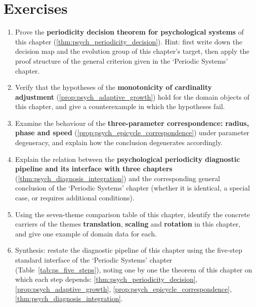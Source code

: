 \section*{Exercises}

\begin{enumerate}[leftmargin=3em, label=\textbf{Exercise \arabic*}]
    \item Prove the \textbf{periodicity decision theorem for psychological systems} of this chapter (\ref{thm:psych_periodicity_decision}). Hint: first write down the decision map and the evolution group of this chapter's target, then apply the proof structure of the general criterion given in the `Periodic Systems' chapter.

    \item Verify that the hypotheses of the \textbf{monotonicity of cardinality adjustment} (\ref{prop:psych_adaptive_growth}) hold for the domain objects of this chapter, and give a counterexample in which the hypotheses fail.

    \item Examine the behaviour of the \textbf{three-parameter correspondence: radius, phase and speed} (\ref{prop:psych_epicycle_correspondence}) under parameter degeneracy, and explain how the conclusion degenerates accordingly.

    \item Explain the relation between the \textbf{psychological periodicity diagnostic pipeline and its interface with three chapters} (\ref{thm:psych_diagnosis_integration}) and the corresponding general conclusion of the `Periodic Systems' chapter (whether it is identical, a special case, or requires additional conditions).

    \item Using the seven-theme comparison table of this chapter, identify the concrete carriers of the themes \textbf{translation}, \textbf{scaling} and \textbf{rotation} in this chapter, and give one example of domain data for each.

    \item Synthesis: restate the diagnostic pipeline of this chapter using the five-step standard interface of the `Periodic Systems' chapter (Table~\ref{tab:ps_five_steps}), noting one by one the theorem of this chapter on which each step depends: \ref{thm:psych_periodicity_decision}, \ref{prop:psych_adaptive_growth}, \ref{prop:psych_epicycle_correspondence}, \ref{thm:psych_diagnosis_integration}.
\end{enumerate}


